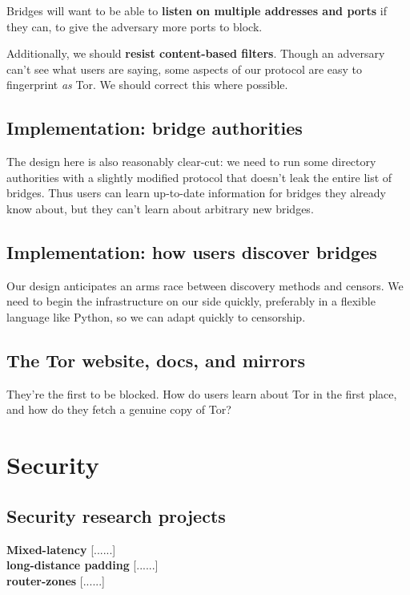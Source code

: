 \documentclass{article}
\newcommand{\tmp}[1]{{\bf #1} [......] \\}
\begin{document}
Bridges will want to be able to {\bf listen on multiple addresses and ports}
if they can, to give the adversary more ports to block.

Additionally, we should {\bf resist content-based filters}.  Though an
adversary can't see what users are saying, some aspects of our protocol are
easy to fingerprint {\em as} Tor.  We should correct this where possible.

\subsection{Implementation: bridge authorities}

The design here is also reasonably clear-cut: we need to run some
directory authorities with a slightly modified protocol that doesn't leak
the entire list of bridges. Thus users can learn up-to-date information
for bridges they already know about, but they can't learn about arbitrary
new bridges.

\subsection{Implementation: how users discover bridges}

Our design anticipates an arms race between discovery methods and censors.
We need to begin the infrastructure on our side quickly, preferably in a
flexible language like Python, so we can adapt quickly to censorship.

\subsection{The Tor website, docs, and mirrors}

They're the first to be blocked. How do users learn about Tor in the
first place, and how do they fetch a genuine copy of Tor?

\section{Security}

\subsection{Security research projects}

\tmp{Mixed-latency}

\tmp{long-distance padding}

\tmp{router-zones}
\end{document}
